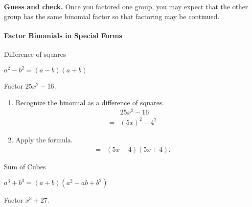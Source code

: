 \begin{trick}
	\textbf{Guess and check.} Once you factored one group, you may expect that the other group has the same binomial factor so that factoring may be continued.
\end{trick}

\paragraph*{Factor Binomials in Special Forms}\mbox{}

	\begin{multicols}{3}
		Difference of squares\\
		\centerline{$a^2-b^2=(a-b)(a+b)$}

		\begin{example}
			Factor $25x^2-16$.
		\end{example}

		\begin{solution}\mbox{}
			\begin{enumerate}[label={\textbf{\textup{Step \arabic*.}}~}]
				\item Recognize the binomial as a difference of squares.
				      \[\begin{split}
						      &25x^2-16\\
						      =&(5x)^2-4^2
					      \end{split}
				      \]
				\item Apply the formula.
				      \[
					      \begin{split}
						      =&(5x-4)(5x+4).
					      \end{split}
				      \]
			\end{enumerate}
		\end{solution}


		\columnbreak

		Sum of Cubes\\
		\centerline{$a^3+b^3=(a+b)(a^2-ab+b^2)$}

		\begin{example}
			Factor $x^3+27$.
		\end{example}


\end{multicols}
